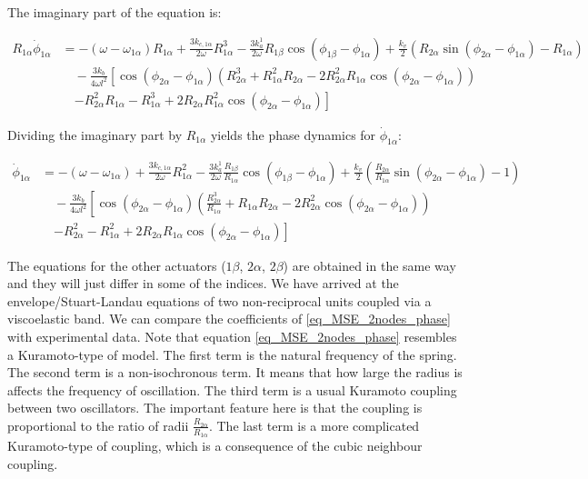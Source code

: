 \documentclass[11pt, a4paper]{article} %
\begin{document}
\begin{appendices}
The imaginary part of the equation is:

\begin{equation}
\begin{aligned}
R_{1\alpha} \dot{\phi}_{1\alpha} &= 
-(\omega - \omega_{1\alpha}) R_{1\alpha} + \frac{3k_{c,1\alpha}}{2\omega} R_{1\alpha}^3 
- \frac{3k_a^{1}}{2\omega} R_{1\beta} \cos(\phi_{1\beta} - \phi_{1\alpha}) 
+ \frac{k_v}{2} (R_{2\alpha}\sin{(\phi_{2\alpha} - \phi_{1\alpha})} - R_{1\alpha}) \\
&\quad - \frac{3k_b}{4\omega l^2} \left[ \cos(\phi_{2\alpha} - \phi_{1\alpha}) 
\left( R_{2\alpha}^3 + R_{1\alpha}^2 R_{2\alpha} - 2R_{2\alpha}^2 R_{1\alpha} \cos(\phi_{2\alpha} - \phi_{1\alpha}) \right) \right. \\
&\quad \left. - R_{2\alpha}^2 R_{1\alpha} - R_{1\alpha}^3 
+ 2R_{2\alpha} R_{1\alpha}^2 \cos(\phi_{2\alpha} - \phi_{1\alpha}) \right]
\end{aligned}
\end{equation}

Dividing the imaginary part by $R_{1\alpha}$ yields the phase dynamics for $\dot{\phi}_{1\alpha}$:

\begin{equation}
\begin{aligned}
\dot{\phi}_{1\alpha} &= 
-(\omega - \omega_{1\alpha}) + \frac{3k_{c,1\alpha}}{2\omega} R_{1\alpha}^2 
- \frac{3k_a^{1}}{2\omega} \frac{R_{1\beta}}{R_{1\alpha}} \cos(\phi_{1\beta} - \phi_{1\alpha}) 
+ \frac{k_v}{2} \left(\frac{R_{2\alpha}}{R_{1\alpha}}\sin{(\phi_{2\alpha} - \phi_{1\alpha})} - 1\right) \\
&\quad - \frac{3k_b}{4\omega l^2} \left[ \cos(\phi_{2\alpha} - \phi_{1\alpha}) 
\left( \frac{R_{2\alpha}^3}{R_{1\alpha}} + R_{1\alpha} R_{2\alpha} - 2R_{2\alpha}^2 \cos(\phi_{2\alpha} - \phi_{1\alpha}) \right) \right. \\
&\quad \left. - R_{2\alpha}^2 - R_{1\alpha}^2 + 2R_{2\alpha} R_{1\alpha} \cos(\phi_{2\alpha} - \phi_{1\alpha}) \right]
\end{aligned}
\end{equation}

The equations for the other actuators ($1\beta$, $2\alpha$, $2\beta$) are obtained in the same way and they will just differ in some of the indices. 
We have arrived at the envelope/Stuart-Landau equations of two non-reciprocal units coupled via a viscoelastic band. We can 
compare the coefficients of \eqref{eq_MSE_2nodes_phase} with experimental data. Note that equation \eqref{eq_MSE_2nodes_phase} 
resembles a Kuramoto-type of model. The first term is the natural frequency of the spring. 
The second term is a non-isochronous term. It means that how large the radius is affects the frequency of oscillation. 
The third term is a usual Kuramoto coupling between two oscillators. The important feature here is that 
the coupling is proportional to the ratio of radii $\frac{R_{2\alpha}}{R_{1\alpha}}$. The last term is a more complicated Kuramoto-type 
of coupling, which is a consequence of the cubic neighbour coupling.


\end{appendices}
\end{document}
